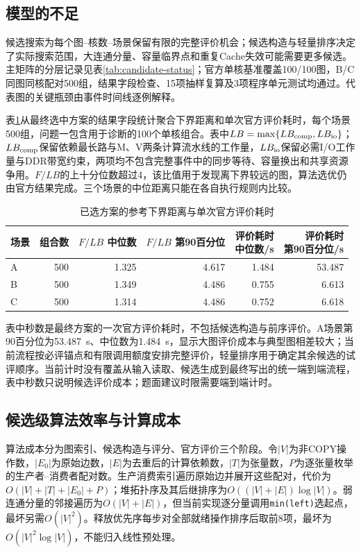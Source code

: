 \subsection{模型的不足}
候选搜索为每个图--核数--场景保留有限的完整评价机会；候选构造与轻量排序决定了实际搜索范围，大连通分量、容量临界点和重复Cache失效可能需要更多候选。主矩阵的分层记录见表\ref{tab:candidate-status}；官方单核基准覆盖100/100图，B/C同图同核配对500组，结果字段检查、15项抽样复算及3项程序单元测试均通过。代表图的关键瓶颈由事件时间线逐例解释。

表\ref{tab:eval-cost}从最终选中方案的结果字段统计聚合下界距离和单次官方评价耗时，每个场景500组，问题一包含用于诊断的100个单核组合。表中$LB=\max\{LB_{\rm comp},LB_{\rm io}\}$；$LB_{\rm comp}$保留依赖最长路与M、V两条计算流水线的工作量，$LB_{\rm io}$保留必需I/O工作量与DDR带宽约束，两项均不包含完整事件中的同步等待、容量换出和共享资源争用。$F/LB$的上十分位数超过4，该比值用于发现离下界较远的图，算法选优仍由官方结果完成。三个场景的中位距离只能在各自执行规则内比较。
\begin{table}[H]\centering\small
\caption{已选方案的参考下界距离与单次官方评价耗时}\label{tab:eval-cost}
\setlength{\tabcolsep}{4pt}
\begin{tabular}{lrrrrr}\toprule
场景 & 组合数 & \shortstack{$F/LB$\\中位数} & \shortstack{$F/LB$\\第90百分位} & \shortstack{评价耗时\\中位数/s} & \shortstack{评价耗时\\第90百分位/s}\\\midrule
A & 500 & 1.325 & 4.617 & 1.484 & 53.487\\
B & 500 & 1.349 & 4.486 & 0.755 & 6.613\\
C & 500 & 1.314 & 4.486 & 0.752 & 6.618\\\bottomrule
\end{tabular}\end{table}

表中秒数是最终方案的一次官方评价耗时，不包括候选构造与前序评价。A场景第90百分位为53.487~s、中位数为1.484~s，显示大图评价成本与典型图相差较大；当前流程按必评锚点和有限调用额度安排完整评价，轻量排序用于确定其余候选的试评顺序。当前计时没有覆盖从输入读取、候选生成到最终写出的统一端到端流程，表中秒数只说明候选评价成本；题面建议时限需要端到端计时。

\subsection{候选级算法效率与计算成本}
算法成本分为图索引、候选构造与评分、官方评价三个阶段。令$|V|$为非COPY操作数，$|E_0|$为原始边数，$|E|$为去重后的计算依赖数，$|T|$为张量数，$P$为逐张量枚举的生产者--消费者配对数。生产消费索引遍历原始边并展开这些配对，代价为$O(|V|+|T|+|E_0|+P)$；堆拓扑序及其后继排序为$O((|V|+|E|)\log |V|)$。弱连通分量的邻接遍历为$O(|V|+|E|)$，但当前实现逐分量调用\texttt{min(left)}选起点，最坏另需$O(|V|^2)$。释放优先序每步对全部就绪操作排序后取前8项，最坏为$O(|V|^2\log |V|)$，不能归入线性预处理。

